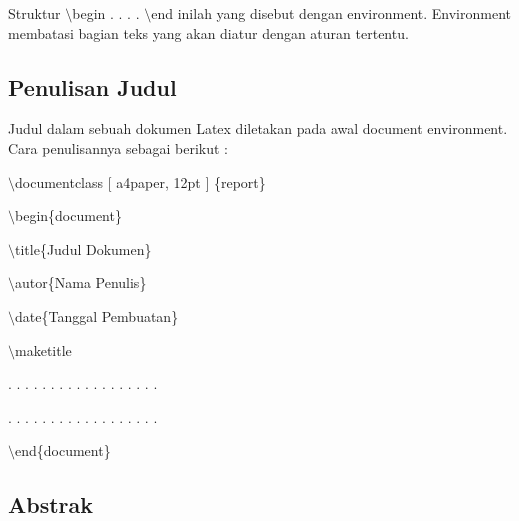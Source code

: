 Struktur $\setminus$begin . . . . $\setminus$end inilah yang disebut dengan environment. Environment membatasi bagian teks yang akan diatur dengan aturan tertentu.\par \vspace{12pt}

\subsection {Penulisan Judul}\par \vspace{12pt}

Judul dalam sebuah dokumen Latex diletakan pada awal document 
environment. Cara penulisannya sebagai berikut :\par \vspace{12pt}

$\setminus$documentclass $[$ a4paper, 12pt $]$ \{report\}\par \vspace{12pt}

$\setminus$begin\{document\}\par \vspace{12pt}

$\setminus$title\{Judul Dokumen\}\par \vspace{12pt}

$\setminus$autor\{Nama Penulis\}\par \vspace{12pt}

$\setminus$date\{Tanggal Pembuatan\}\par \vspace{12pt}

$\setminus$maketitle\par \vspace{12pt}

. . . . . . . . . . . . . . . . . .

. . . . . . . . . . . . . . . . . .\par \vspace{12pt}

$\setminus$end\{document\}\par \vspace{12pt}



\subsection {Abstrak}\par \vspace{12pt}

